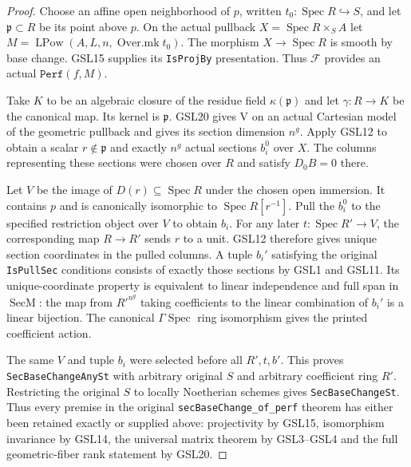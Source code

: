 \documentclass[11pt,a4paper]{article}
\numberwithin{equation}{section}
\theoremstyle{remark}\newtheorem{remark}[theorem]{Remark}
\begin{document}
\begin{proof}
Choose an affine open neighborhood of $p$, written
$t_0:\operatorname{Spec}R\hookrightarrow S$, and let
$\mathfrak p\subset R$ be its point above $p$.
On the actual pullback $X=\operatorname{Spec}R\times_S A$
let $M=\operatorname{LPow}(A,L,n,\operatorname{Over.mk}t_0)$.
The morphism $X\to\operatorname{Spec}R$ is smooth by base
change.  GSL15 supplies its \texttt{Is\allowbreak Proj\allowbreak By} presentation.
Thus $\mathcal F$ provides an actual $\texttt{Perf}(f,M)$.

Take $K$ to be an algebraic closure of the residue field
$\kappa(\mathfrak p)$ and let $\gamma:R\to K$ be the
canonical map.  Its kernel is $\mathfrak p$.
GSL20 gives $\mathrm V$ on an actual Cartesian model of
the geometric pullback and gives its section dimension
$n^g$.  Apply GSL12 to obtain a scalar $r\notin\mathfrak p$
and exactly $n^g$ actual sections $b_i^0$ over $X$.
The columns representing these sections were chosen over
$R$ and satisfy $D_0B=0$ there.

Let $V$ be the image of $D(r)\subseteq\operatorname{Spec}R$
under the chosen open immersion.  It contains $p$ and
is canonically isomorphic to $\operatorname{Spec}R[r^{-1}]$.
Pull the $b_i^0$ to the specified restriction object over
$V$ to obtain $b_i$.  For any later $t:\operatorname{Spec}R'\to V$,
the corresponding map $R\to R'$ sends $r$ to a unit.
GSL12 therefore gives unique section coordinates in the
pulled columns.  A tuple $b_i'$ satisfying the original
\texttt{Is\allowbreak Pull\allowbreak Sec} conditions consists of exactly those
sections by GSL1 and GSL11.  Its unique-coordinate property
is equivalent to linear independence and full span in
$\operatorname{SecM}$: the map from $R'^{n^g}$ taking
coefficients to the linear combination of $b_i'$ is a
linear bijection.  The canonical $\Gamma\operatorname{Spec}$
ring isomorphism gives the printed coefficient action.

The same $V$ and tuple $b_i$ were selected before all
$R',t,b'$.  This proves \texttt{Sec\allowbreak Base\allowbreak Change\allowbreak Any\allowbreak St} with
arbitrary original $S$ and arbitrary coefficient ring $R'$.
Restricting the original $S$ to locally Noetherian schemes
gives \texttt{Sec\allowbreak Base\allowbreak Change\allowbreak St}.  Thus every premise in the
original \texttt{sec\allowbreak Base\allowbreak Change\_\allowbreak of\_\allowbreak perf} theorem has either
been retained exactly or supplied above: projectivity by
GSL15, isomorphism invariance by GSL14, the universal matrix
theorem by GSL3--GSL4 and the full geometric-fiber rank
statement by GSL20.
\end{proof}
\end{document}
